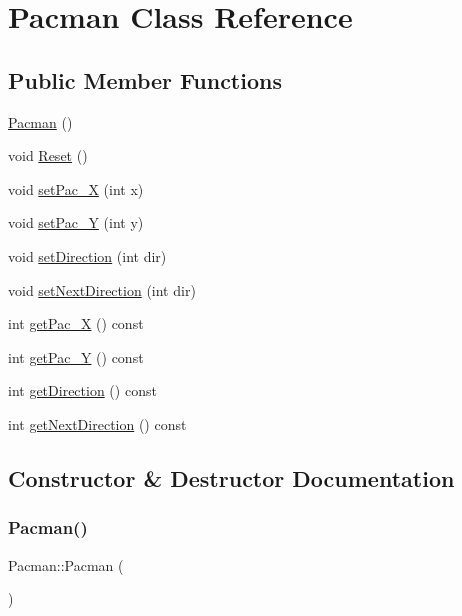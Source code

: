 \hypertarget{class_pacman}{}\section{Pacman Class Reference}
\label{class_pacman}
\subsection*{Public Member Functions}
\begin{DoxyCompactItemize}
\item 
\mbox{\hyperlink{class_pacman_a499408baab38f119ebd4f41e90fbe3fe}{Pacman}} ()
\item 
void \mbox{\hyperlink{class_pacman_ad1666842876ddd5f4ff615606a5260d7}{Reset}} ()
\item 
void \mbox{\hyperlink{class_pacman_a2cbe5344bf0a7e29524bb7f026798304}{set\+Pac\+\_\+X}} (int x)
\item 
void \mbox{\hyperlink{class_pacman_a416b6b39586797636222e40fea820522}{set\+Pac\+\_\+Y}} (int y)
\item 
void \mbox{\hyperlink{class_pacman_a388f4708c08ba930b471237a897f522e}{set\+Direction}} (int dir)
\item 
void \mbox{\hyperlink{class_pacman_a0c03f6603520227d0e79ae1266eeaa85}{set\+Next\+Direction}} (int dir)
\item 
int \mbox{\hyperlink{class_pacman_a93ca0d51d936c37cec6903766331fd88}{get\+Pac\+\_\+X}} () const
\item 
int \mbox{\hyperlink{class_pacman_a1195bf43607ca5e957446fccad19c41d}{get\+Pac\+\_\+Y}} () const
\item 
int \mbox{\hyperlink{class_pacman_ab7e69962867252fce2fe615993490918}{get\+Direction}} () const
\item 
int \mbox{\hyperlink{class_pacman_a18fd9d143f06a908da03db6f79e8b617}{get\+Next\+Direction}} () const
\end{DoxyCompactItemize}


\subsection{Constructor \& Destructor Documentation}
\mbox{\label{class_pacman_a499408baab38f119ebd4f41e90fbe3fe}} 
\subsubsection{\texorpdfstring{Pacman()}{Pacman()}}
{\footnotesize\ttfamily Pacman\+::\+Pacman (\begin{DoxyParamCaption}{ }\end{DoxyParamCaption})}

